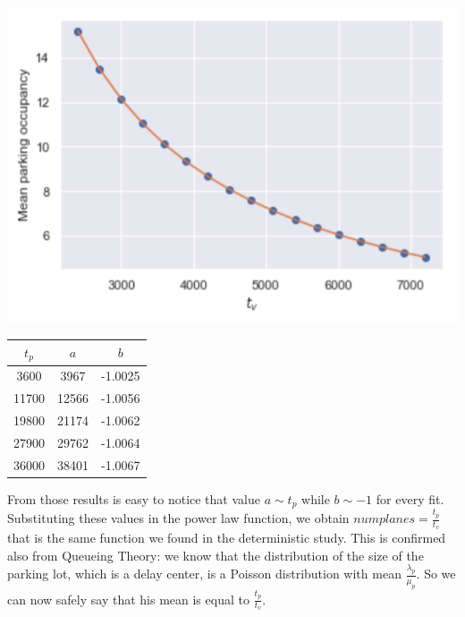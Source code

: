 \documentclass[12pt]{article}
\begin{document}
\begin{minipage}{\textwidth}
  \begin{minipage}[b]{0.48\textwidth}
    \centering
    \includegraphics[width=\textwidth]{report/immagini/parking_fitting.png}
	\label{parking_fitting}
  \end{minipage}
  \hfill
  \begin{minipage}[b]{0.46\textwidth}
    \centering
    \begin{tabular}{ccc}
\hline
$t_p$      & $a$     & $b$       \\ 
\hline
3600  & 3967  & -1.0025 \\ 
11700 & 12566 & -1.0056 \\ 
19800 & 21174 & -1.0062 \\ 
27900 & 29762 & -1.0064 \\
36000 & 38401 & -1.0067 \\
\hline
\end{tabular}
      \label{a_b_values}
    \end{minipage}
 \end{minipage}
  
\bigskip 

From those results is easy to notice that value $a \sim t_p$ while $b \sim -1$ for every fit. Substituting these values in the power law function, we obtain $numplanes=\frac{t_{p}}{t_v}$ that is the same function we found in the deterministic study. This is confirmed also from Queueing Theory: we know that the distribution of the size of the parking lot, which is a delay center, is a Poisson distribution with mean $\frac{\lambda_p}{\mu_p}$. So we can now safely say that his mean is equal to $\frac{t_{p}}{t_v}$.
\end{document}
